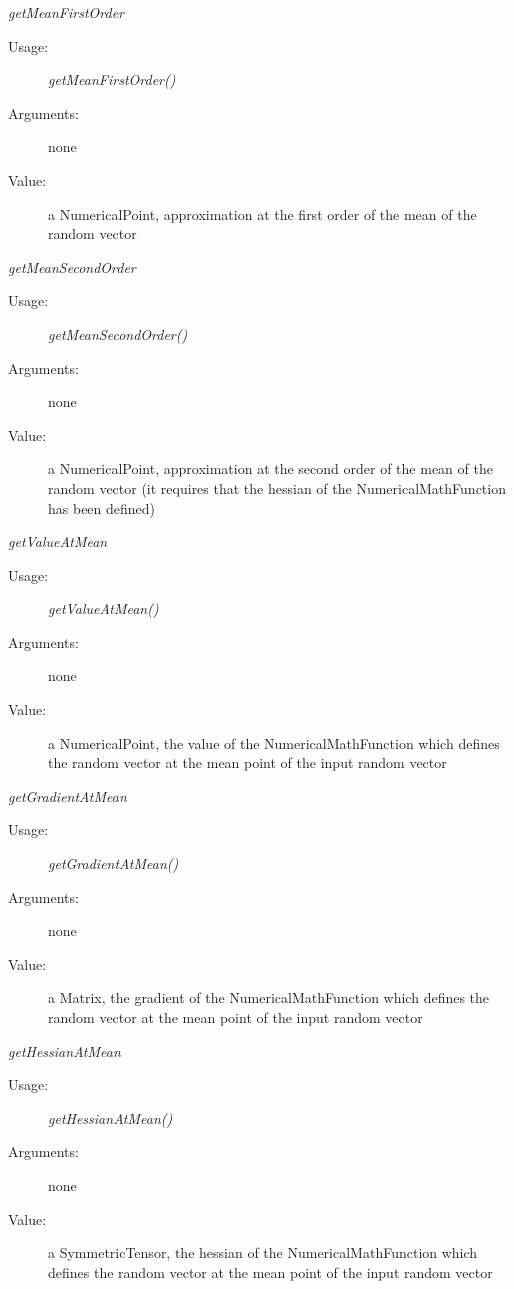 \begin{description}
\begin{description}
\bigskip
\item \textit{getMeanFirstOrder}
\begin{description}
\item[Usage:] \textit{getMeanFirstOrder()}
\item[Arguments:] none
\item[Value:] a NumericalPoint, approximation at the first order of the mean of the random vector
\end{description}
\bigskip


\item \textit{getMeanSecondOrder}
\begin{description}
\item[Usage:] \textit{getMeanSecondOrder()}
\item[Arguments:] none
\item[Value:] a NumericalPoint, approximation at the second order of the mean of the random vector (it requires that the hessian of the NumericalMathFunction has been defined)
\end{description}
\bigskip

\item \textit{getValueAtMean}
\begin{description}
\item[Usage:] \textit{getValueAtMean()}
\item[Arguments:] none
\item[Value:] a NumericalPoint, the value of the NumericalMathFunction which defines the random vector at the mean point of the input random vector
\end{description}
\bigskip

\item \textit{getGradientAtMean}
\begin{description}
\item[Usage:] \textit{getGradientAtMean()}
\item[Arguments:] none
\item[Value:] a Matrix, the gradient of the NumericalMathFunction which defines the random vector at the mean point of the input random vector
\end{description}
\bigskip

\item \textit{getHessianAtMean}
\begin{description}
\item[Usage:] \textit{getHessianAtMean()}
\item[Arguments:] none
\item[Value:] a SymmetricTensor, the hessian of the NumericalMathFunction which defines the random vector at the mean point of the input random vector
\end{description}

\end{description}

\end{description}
